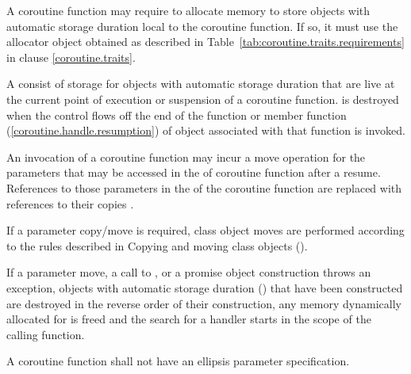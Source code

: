 \pnum
A coroutine function may require to allocate
memory to store objects with automatic storage duration
local to the coroutine function. If so, it must
use the allocator object obtained as described in 
Table~\ref{tab:coroutine.traits.requirements} in clause \ref{coroutine.traits}.

\pnum
A  consist of 
storage for objects with automatic storage duration
that are live at the current point of execution or suspension of 
a coroutine function.
 is destroyed when
the control flows off the end of the function or
 member function (\ref{coroutine.handle.resumption}) of  object associated with that function is invoked.

\pnum
An invocation of a coroutine function may incur a move operation for the parameters that may be accessed in the 
of coroutine function after a resume. 
References to those parameters in the 
of the coroutine function are replaced with 
references to their copies .

\pnum
If a parameter copy/move is required, class object moves are performed according to the rules described in Copying and moving class objects ().

\pnum
If a parameter move, a call to , or a promise object construction throws
an exception, objects with automatic storage duration () that have been
constructed are destroyed in the reverse order of their construction, any memory dynamically allocated 
for  is freed
and the search for a handler starts in the scope of the calling function. 

\pnum
A coroutine function shall not have an ellipsis parameter specification. 


%
